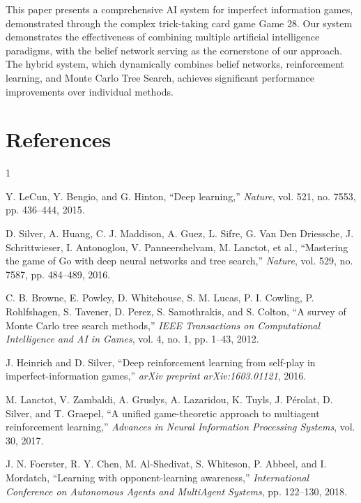 \documentclass[conference]{IEEEtran}
\begin{document}
This paper presents a comprehensive AI system for imperfect information games, demonstrated through the complex trick-taking card game Game 28. Our system demonstrates the effectiveness of combining multiple artificial intelligence paradigms, with the belief network serving as the cornerstone of our approach. The hybrid system, which dynamically combines belief networks, reinforcement learning, and Monte Carlo Tree Search, achieves significant performance improvements over individual methods.

\section*{References}

\begin{thebibliography}{1}

Y. LeCun, Y. Bengio, and G. Hinton, ``Deep learning,'' \textit{Nature}, vol. 521, no. 7553, pp. 436--444, 2015.

D. Silver, A. Huang, C. J. Maddison, A. Guez, L. Sifre, G. Van Den Driessche, J. Schrittwieser, I. Antonoglou, V. Panneershelvam, M. Lanctot, et al., ``Mastering the game of Go with deep neural networks and tree search,'' \textit{Nature}, vol. 529, no. 7587, pp. 484--489, 2016.

C. B. Browne, E. Powley, D. Whitehouse, S. M. Lucas, P. I. Cowling, P. Rohlfshagen, S. Tavener, D. Perez, S. Samothrakis, and S. Colton, ``A survey of Monte Carlo tree search methods,'' \textit{IEEE Transactions on Computational Intelligence and AI in Games}, vol. 4, no. 1, pp. 1--43, 2012.

J. Heinrich and D. Silver, ``Deep reinforcement learning from self-play in imperfect-information games,'' \textit{arXiv preprint arXiv:1603.01121}, 2016.

M. Lanctot, V. Zambaldi, A. Gruslys, A. Lazaridou, K. Tuyls, J. Pérolat, D. Silver, and T. Graepel, ``A unified game-theoretic approach to multiagent reinforcement learning,'' \textit{Advances in Neural Information Processing Systems}, vol. 30, 2017.

J. N. Foerster, R. Y. Chen, M. Al-Shedivat, S. Whiteson, P. Abbeel, and I. Mordatch, ``Learning with opponent-learning awareness,'' \textit{International Conference on Autonomous Agents and MultiAgent Systems}, pp. 122--130, 2018.


\end{thebibliography}
\end{document}
